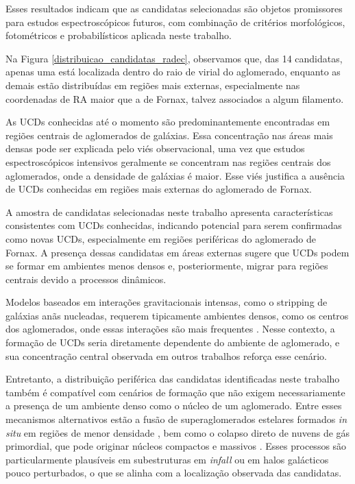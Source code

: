 Esses resultados indicam que as candidatas selecionadas são objetos promissores para estudos espectroscópicos futuros, com combinação de critérios morfológicos, fotométricos e probabilísticos aplicada neste trabalho.

Na Figura \ref{distribuicao_candidatas_radec}, observamos que, das 14 candidatas, apenas uma está localizada dentro do raio de virial do aglomerado, enquanto as demais estão distribuídas em regiões mais externas, especialmente nas coordenadas de RA maior que a de Fornax, talvez associados a algum filamento.

As UCDs conhecidas até o momento são predominantemente encontradas em regiões centrais de aglomerados de galáxias. Essa concentração nas áreas mais densas pode ser explicada pelo viés observacional, uma vez que estudos espectroscópicos intensivos geralmente se concentram nas regiões centrais dos aglomerados, onde a densidade de galáxias é maior. Esse viés justifica a ausência de UCDs conhecidas em regiões mais externas do aglomerado de Fornax.

A amostra de candidatas selecionadas neste trabalho apresenta características consistentes com UCDs conhecidas, indicando potencial para serem confirmadas como novas UCDs, especialmente em regiões periféricas do aglomerado de Fornax. A presença dessas candidatas em áreas externas sugere que UCDs podem se formar em ambientes menos densos e, posteriormente, migrar para regiões centrais devido a processos dinâmicos.

Modelos baseados em interações gravitacionais intensas, como o stripping de galáxias anãs nucleadas, requerem tipicamente ambientes densos, como os centros dos aglomerados, onde essas interações são mais frequentes \citep{Bekki_2001,Pfeffer_2016}. Nesse contexto, a formação de UCDs seria diretamente dependente do ambiente de aglomerado, e sua concentração central observada em outros trabalhos reforça esse cenário. 

Entretanto, a distribuição periférica das candidatas identificadas neste trabalho também é compatível com cenários de formação que não exigem necessariamente a presença de um ambiente denso como o núcleo de um aglomerado. Entre esses mecanismos alternativos estão a fusão de superaglomerados estelares formados \textit{in situ} em regiões de menor densidade \citep{Mieske_2011}, bem como o colapso direto de nuvens de gás primordial, que pode originar núcleos compactos e massivos \citep{Drinkwater_2003}. Esses processos são particularmente plausíveis em subestruturas em \textit{infall} ou em halos galácticos pouco perturbados, o que se alinha com a localização observada das candidatas.

